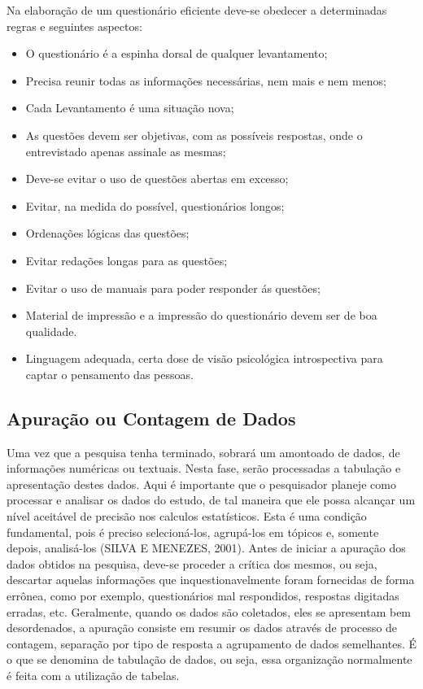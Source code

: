 \inic Na elaboração de um questionário eficiente deve-se obedecer a determinadas regras e seguintes aspectos:

\begin{itemize}
\item O questionário é a espinha dorsal de qualquer levantamento;
\item Precisa reunir todas as informações necessárias, nem mais e nem menos;
\item Cada Levantamento é uma situação nova;
  \item As questões devem ser objetivas, com as possíveis respostas, onde o entrevistado apenas assinale as mesmas;
  \item Deve-se evitar o uso de questões abertas em excesso;
  \item Evitar, na medida do possível, questionários longos;
  \item Ordenações lógicas das questões;
  \item Evitar redações longas para as questões;
  \item Evitar o uso de manuais para poder responder ás questões;
  \item Material de impressão e a impressão do questionário devem ser de boa qualidade.
  \item Linguagem adequada, certa dose de visão psicológica introspectiva para captar o pensamento das pessoas.
\end{itemize}


\subsection{Apuração ou Contagem de Dados}

\inic Uma vez que a pesquisa tenha terminado, sobrará um amontoado de dados, de informações numéricas ou textuais. Nesta fase, serão
processadas a tabulação e apresentação destes dados. Aqui é
importante que o pesquisador planeje como processar e analisar os
dados do estudo, de tal maneira que ele possa alcançar um nível
aceitável de precisão nos calculos estatísticos. Esta é uma
condição fundamental, pois é preciso selecioná-los, agrupá-los em
tópicos e, somente depois, analisá-los (SILVA E MENEZES, 2001).
Antes de iniciar a apuração dos dados obtidos na pesquisa, deve-se
proceder a crítica dos mesmos, ou seja, descartar aquelas
informações que inquestionavelmente foram fornecidas de forma
errônea, como por exemplo, questionários mal respondidos,
respostas digitadas erradas, etc. Geralmente, quando os dados são
coletados, eles se apresentam bem desordenados, a apuração
consiste em resumir os dados através de processo de contagem,
separação por tipo de resposta a agrupamento de dados semelhantes.
É o que se denomina de tabulação de dados, ou seja, essa
organização normalmente é feita com a utilização de tabelas.\vskip0.3cm

